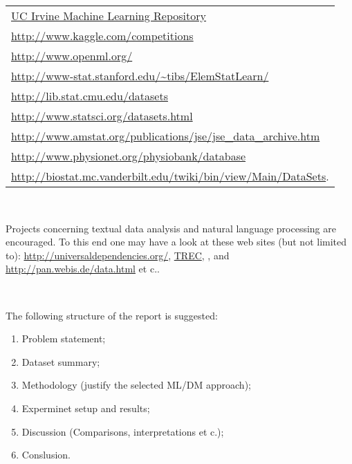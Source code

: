\documentclass[12pt]{article}         %
\begin{document}


 \begin{tabular}{|l|}

   \hline
\href{http://archive.ics.uci.edu/ml/}{UC Irvine Machine Learning Repository}\\
\url{http://www.kaggle.com/competitions}{}\\
\url{http://www.openml.org/}{}\\
\url{http://www-stat.stanford.edu/~tibs/ElemStatLearn/}{}\\
\url{http://lib.stat.cmu.edu/datasets}{}\\
\url{http://www.statsci.org/datasets.html}{}\\
\url{http://www.amstat.org/publications/jse/jse_data_archive.htm}{}\\
\url{http://www.physionet.org/physiobank/database}{}\\
\url{http://biostat.mc.vanderbilt.edu/twiki/bin/view/Main/DataSets}{}.\\
   \hline

 \end{tabular}

 \

Projects concerning textual data analysis and natural language processing are encouraged.
To this end one may have a look at these web sites (but not limited to):
\url{http://universaldependencies.org/}, \href{http://trec.nist.gov/}{TREC},
\href{http://www.clef-initiative.eu/dataset/test-collection}{},
and \url{http://pan.webis.de/data.html} et c..


 \

The following structure of the report is suggested:
\begin{enumerate}
  \item Problem statement;
  \item Dataset summary;
  \item Methodology (justify the selected ML/DM approach);
  \item Experminet setup and results;
  \item Discussion (Comparisons, interpretations et c.);
  \item Conslusion.
\end{enumerate}
\end{document}
